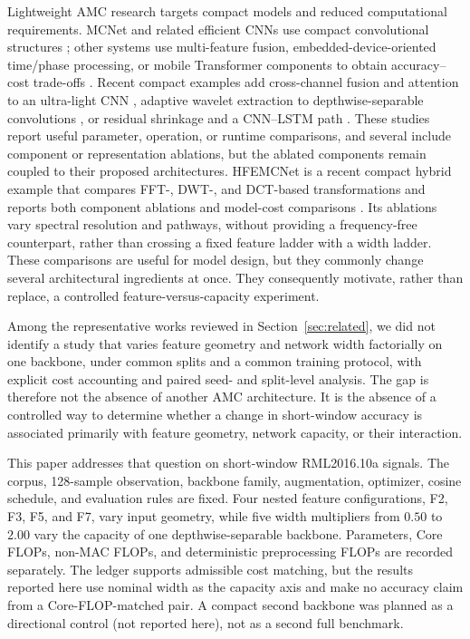 Lightweight AMC research targets compact models and reduced computational
requirements. MCNet and related efficient CNNs use compact convolutional
structures \cite{HuynhThe2020MCNet,Lin2020HybridNet}; other systems use
multi-feature fusion, embedded-device-oriented time/phase processing, or mobile
Transformer components to obtain accuracy--cost trade-offs
\cite{Cui2023TimePhase,Li2023LightMFFS,Fei2024MobileAmcT,Zheng2023MobileRaT}.
Recent compact examples add cross-channel fusion and attention to an ultra-light
CNN \cite{Wang2024ULNN}, adaptive wavelet extraction to depthwise-separable
convolutions \cite{Quan2024ALWNN}, or residual shrinkage and a CNN--LSTM path
\cite{Suman2025DPDRSN}. These studies report useful parameter, operation, or
runtime comparisons, and several include component or representation ablations,
but the ablated components remain coupled to their proposed architectures.
HFEMCNet is a recent
compact hybrid example that compares FFT-, DWT-, and DCT-based transformations
and reports both component ablations and model-cost comparisons
\cite{Ijaz2026HFEMCNet}. Its ablations vary spectral resolution and pathways,
without providing a frequency-free counterpart, rather than crossing a fixed
feature ladder with a width ladder. These
comparisons are useful for model design, but they commonly change several
architectural ingredients at once. They consequently motivate, rather than
replace, a controlled feature-versus-capacity experiment.

Among the representative works reviewed in Section~\ref{sec:related}, we did
not identify a study that varies feature geometry and network width factorially
on one backbone, under common splits and a common training protocol, with
explicit cost accounting and paired seed- and split-level analysis. The gap is
therefore not the absence of another AMC architecture. It is the absence of a
controlled way to determine whether a change in short-window accuracy is
associated primarily with feature geometry, network capacity, or their
interaction.

This paper addresses that question on short-window RML2016.10a signals. The
corpus, 128-sample observation, backbone family, augmentation, optimizer,
cosine schedule, and evaluation rules are fixed. Four nested feature
configurations, F2, F3, F5, and F7, vary input geometry, while five width
multipliers from $0.50$ to $2.00$ vary the capacity of one depthwise-separable
backbone. Parameters, Core FLOPs, non-MAC FLOPs, and deterministic
preprocessing FLOPs are recorded separately. The ledger supports admissible
cost matching, but the results reported here use nominal width as the capacity
axis and make no accuracy claim from a Core-FLOP-matched pair. A compact second
backbone was planned as a directional control (not reported here), not as a
second full benchmark.

